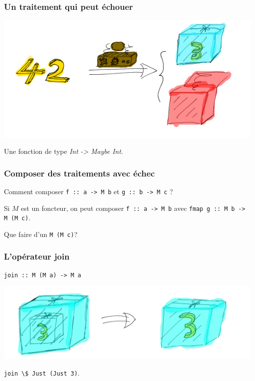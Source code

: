 \documentclass{beamer}
\begin{document}
\begin{frame}
\frametitle{Un traitement qui peut échouer}

\begin{center}
\includegraphics[scale=0.5]{failure.png}
\end{center}
\begin{exampleblock}{}
Une fonction de type \emph{Int -> Maybe Int}.
\end{exampleblock}
\end{frame}

\begin{frame}
\frametitle{Composer des traitements avec échec}
\begin{block}{}
Comment composer \verb!f :: a -> M b! et \verb!g :: b -> M c! ?
\end{block}
\pause
\begin{block}{}
Si $M$ est un foncteur, on peut composer
\verb!f :: a -> M b! avec \verb!fmap g :: M b -> M (M c)!.
\end{block}
\pause
\begin{block}{}
Que faire d'un \verb!M (M c)!?
\end{block}

\end{frame}

\begin{frame}
\frametitle{L'opérateur join}
\begin{block}{}
\begin{center}
\verb!join :: M (M a) -> M a!
\end{center}
\end{block}

\begin{center}
\includegraphics[scale=0.2]{join.png}
\end{center}
\pause
\begin{exampleblock}{}
\begin{center}
\verb!join \$ Just (Just 3)!.
\end{center}
\end{exampleblock}
\end{frame}
\end{document}

